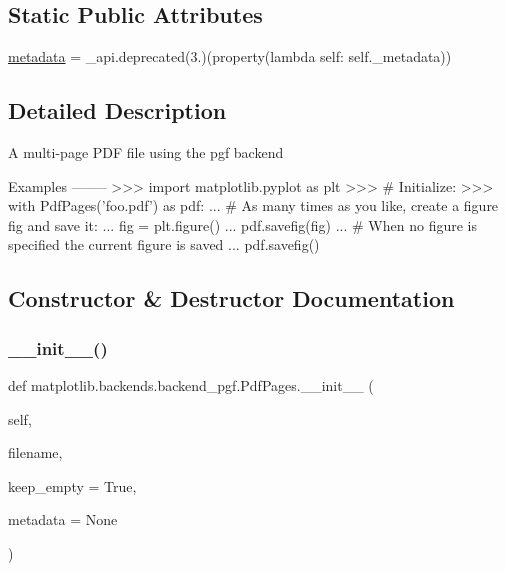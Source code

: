 \subsection*{Static Public Attributes}
\begin{DoxyCompactItemize}
\item 
\hyperlink{classmatplotlib_1_1backends_1_1backend__pgf_1_1PdfPages_abc6bfec62cb55e092bf709e7b0cf6dfb}{metadata} = \+\_\+api.\+deprecated(\textquotesingle{}3.\textquotesingle{})(property(lambda self\+: self.\+\_\+metadata))
\end{DoxyCompactItemize}


\subsection{Detailed Description}
\begin{DoxyVerb}A multi-page PDF file using the pgf backend

Examples
--------
>>> import matplotlib.pyplot as plt
>>> # Initialize:
>>> with PdfPages('foo.pdf') as pdf:
...     # As many times as you like, create a figure fig and save it:
...     fig = plt.figure()
...     pdf.savefig(fig)
...     # When no figure is specified the current figure is saved
...     pdf.savefig()
\end{DoxyVerb}
 

\subsection{Constructor \& Destructor Documentation}
\mbox{\label{classmatplotlib_1_1backends_1_1backend__pgf_1_1PdfPages_a75f33cc81e3f6e3522f7b6be9a6e3daa}} 
\subsubsection{\texorpdfstring{\+\_\+\+\_\+init\+\_\+\+\_\+()}{\_\_init\_\_()}}
{\footnotesize\ttfamily def matplotlib.\+backends.\+backend\+\_\+pgf.\+Pdf\+Pages.\+\_\+\+\_\+init\+\_\+\+\_\+ (\begin{DoxyParamCaption}\item[{}]{self,  }\item[{}]{filename,  }\item[{}]{keep\+\_\+empty = {\ttfamily True},  }\item[{}]{metadata = {\ttfamily None} }\end{DoxyParamCaption})}

